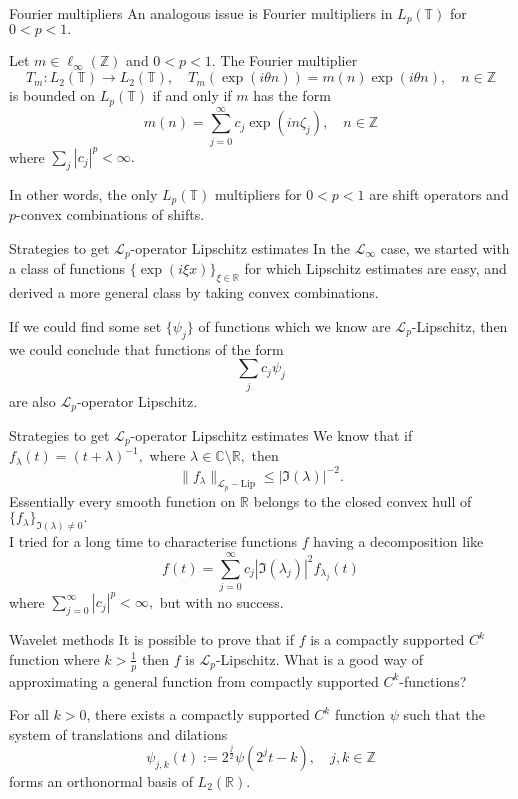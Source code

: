 \documentclass{beamer}
\numberwithin{equation}{section}
\theoremstyle{plain}
\theoremstyle{plain}
\theoremstyle{definition}
\theoremstyle{plain}
\theoremstyle{plain}
\theoremstyle{definition}
\newcommand{\Rl}{\mathbb{R}}
\newcommand{\Cplx}{\mathbb{C}}
\newcommand{\Itgr}{\mathbb{Z}}
\newcommand{\Circ}{\mathbb{T}}
\newcommand{\Lc}{\mathcal{L}}
\begin{document}
\begin{frame}{Fourier multipliers}
    An analogous issue is Fourier multipliers in $L_p(\Circ)$ for $0<p<1.$
    \begin{theorem}
        Let $m \in \ell_{\infty}(\Itgr)$ and $0<p<1.$ The Fourier multiplier
        \[
            T_m:L_2(\Circ)\to L_2(\Circ),\quad T_m(\exp(i\theta n)) = m(n)\exp(i\theta n),\quad n\in \Itgr
        \]
        is bounded on $L_p(\Circ)$ if and only if $m$ has the form
        \[
            m(n) = \sum_{j=0}^\infty c_j \exp(in\zeta_j),\quad n\in \Itgr
        \]
        where $\sum_{j} |c_j|^p < \infty.$
    \end{theorem}
    In other words, the only $L_p(\Circ)$ multipliers for $0<p<1$ are shift operators and $p$-convex combinations of shifts.
\end{frame}

\begin{frame}{Strategies to get $\Lc_p$-operator Lipschitz estimates}
    In the $\Lc_{\infty}$ case, we started with a class of functions $\{\exp(i\xi x)\}_{\xi\in \Rl}$ for which Lipschitz estimates are easy, and derived a more general class by taking convex combinations.

    If we could find some set $\{\psi_j\}$ of functions which we know are $\Lc_p$-Lipschitz, then we could conclude that functions of the form
    \[
        \sum_j c_j\psi_j
    \]
    are also $\Lc_p$-operator Lipschitz.
\end{frame}

\begin{frame}{Strategies to get $\Lc_p$-operator Lipschitz estimates}
    We know that if $f_\lambda(t) = (t+\lambda)^{-1},$ where $\lambda\in \Cplx\setminus \Rl,$ then
    \[
        \|f_{\lambda}\|_{\Lc_p-\mathrm{Lip}} \leq |\Im(\lambda)|^{-2}.
    \]
    Essentially every smooth function on $\Rl$ belongs to the closed convex hull of $\{f_\lambda\}_{\Im(\lambda)\neq 0}.$\\
    \pause
    I tried for a long time to characterise functions $f$ having a decomposition like
    \[
        f(t) = \sum_{j=0}^\infty c_j|\Im(\lambda_j)|^2f_{\lambda_j}(t)
    \]
    where $\sum_{j=0}^\infty |c_j|^p < \infty,$ but with no success.
\end{frame}

\begin{frame}{Wavelet methods}
    It is possible to prove that if $f$ is a compactly supported $C^k$ function where $k > \frac{1}{p}$ then $f$ is $\Lc_p$-Lipschitz.
    \pause
    What is a good way of approximating a general function from compactly supported $C^k$-functions?\pause
    \begin{theorem}[Daubechies (1988)]
        For all $k>0$, there exists a compactly supported $C^k$ function $\psi$ such that the system of translations
        and dilations
        \begin{equation*}
            \psi_{j,k}(t) := 2^{\frac{j}{2}}\psi(2^jt-k),\quad j,k\in \Itgr
        \end{equation*}
        forms an orthonormal basis of $L_2(\Rl).$
    \end{theorem}
\end{frame}
\end{document}
